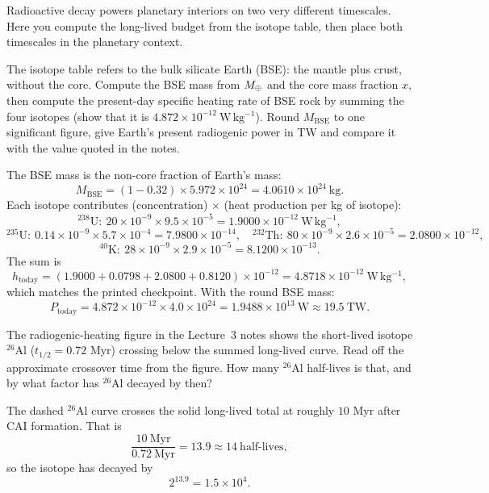 
Radioactive decay powers planetary interiors on two very different timescales.
Here you compute the long-lived budget from the isotope table, then place both timescales in the planetary context.

\parti The isotope table refers to the bulk silicate Earth (BSE): the mantle plus crust, without the core.
Compute the BSE mass from $M_{\oplus}$ and the core mass fraction $x$, then compute the present-day
specific heating rate of BSE rock by summing the four isotopes
(show that it is $4.872 \times 10^{-12}\ \mathrm{W\,kg^{-1}}$).
Round $M_\mathrm{BSE}$ to one significant figure, give Earth's present radiogenic power in TW
and compare it with the value quoted in the notes.

\begin{solution}
The BSE mass is the non-core fraction of Earth's mass:
\[
  M_\mathrm{BSE} = (1 - 0.32) \times 5.972 \times 10^{24} = 4.0610 \times 10^{24}\ \mathrm{kg}.
\]
Each isotope contributes (concentration) $\times$ (heat production per kg of isotope):
\[
  {}^{238}\mathrm{U}:\ 20 \times 10^{-9} \times 9.5 \times 10^{-5} = 1.9000 \times 10^{-12}\ \mathrm{W\,kg^{-1}},
\]
\[
  {}^{235}\mathrm{U}:\ 0.14 \times 10^{-9} \times 5.7 \times 10^{-4} = 7.9800 \times 10^{-14},
  \quad
  {}^{232}\mathrm{Th}:\ 80 \times 10^{-9} \times 2.6 \times 10^{-5} = 2.0800 \times 10^{-12},
\]
\[
  {}^{40}\mathrm{K}:\ 28 \times 10^{-9} \times 2.9 \times 10^{-5} = 8.1200 \times 10^{-13}.
\]
The sum is
\[
  h_\mathrm{today} = (1.9000 + 0.0798 + 2.0800 + 0.8120) \times 10^{-12}
                   = 4.8718 \times 10^{-12}\ \mathrm{W\,kg^{-1}},
\]
which matches the printed checkpoint. With the round BSE mass:
\[
  P_\mathrm{today} = 4.872 \times 10^{-12} \times 4.0 \times 10^{24} = 1.9488 \times 10^{13}\ \mathrm{W} \approx 19.5\ \mathrm{TW}.
\]
\end{solution}

\parti The radiogenic-heating figure in the Lecture~3 notes shows the short-lived isotope
${}^{26}\mathrm{Al}$ ($t_{1/2} = 0.72$ Myr) crossing below the summed long-lived curve.
Read off the approximate crossover time from the figure.
How many ${}^{26}\mathrm{Al}$ half-lives is that, and by what factor has
${}^{26}\mathrm{Al}$ decayed by then?

\begin{solution}
The dashed ${}^{26}\mathrm{Al}$ curve crosses the solid long-lived total at roughly $10$ Myr after CAI formation.
That is
\[
  \frac{10\ \mathrm{Myr}}{0.72\ \mathrm{Myr}} = 13.9 \approx 14\ \text{half-lives},
\]
so the isotope has decayed by
\[
  2^{13.9} = 1.5 \times 10^{4}.
\]
\end{solution}


